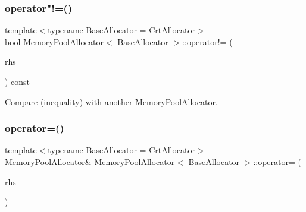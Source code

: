 \subsubsection{\texorpdfstring{operator"!=()}{operator!=()}}
{\footnotesize\ttfamily template$<$typename Base\+Allocator = Crt\+Allocator$>$ \\
bool \hyperlink{classMemoryPoolAllocator}{Memory\+Pool\+Allocator}$<$ Base\+Allocator $>$\+::operator!= (\begin{DoxyParamCaption}\item[{const \hyperlink{classMemoryPoolAllocator}{Memory\+Pool\+Allocator}$<$ Base\+Allocator $>$ \&}]{rhs }\end{DoxyParamCaption}) const\hspace{0.3cm}{\ttfamily [inline]}}



Compare (inequality) with another \hyperlink{classMemoryPoolAllocator}{Memory\+Pool\+Allocator}. 

\mbox{\label{classMemoryPoolAllocator_a37de236cab0a94c6836b1d02475d4683}} 
\subsubsection{\texorpdfstring{operator=()}{operator=()}}
{\footnotesize\ttfamily template$<$typename Base\+Allocator = Crt\+Allocator$>$ \\
\hyperlink{classMemoryPoolAllocator}{Memory\+Pool\+Allocator}\& \hyperlink{classMemoryPoolAllocator}{Memory\+Pool\+Allocator}$<$ Base\+Allocator $>$\+::operator= (\begin{DoxyParamCaption}\item[{const \hyperlink{classMemoryPoolAllocator}{Memory\+Pool\+Allocator}$<$ Base\+Allocator $>$ \&}]{rhs }\end{DoxyParamCaption})\hspace{0.3cm}{\ttfamily [inline]}}

\mbox{\label{classMemoryPoolAllocator_ab2b847d46e865b541c38fb68dfc7d408}} 
